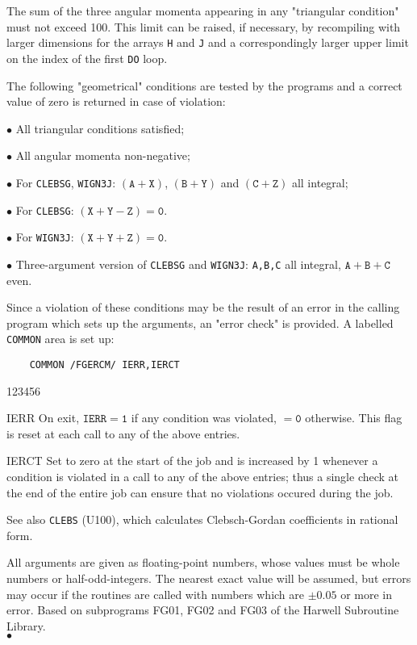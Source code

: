 \Restrict
The sum of the three angular momenta appearing in any "triangular
condition" must not exceed 100. This limit can be raised, if necessary,
by recompiling with larger dimensions for the arrays {\tt H} and {\tt J}
and a correspondingly larger upper limit on the index of the first
{\tt DO} loop.
\par
The following "geometrical" conditions are tested by the programs
and a correct value of zero is returned in case of violation:
\newpage
\begin{DLtt}{12}
\item[$\bullet$] All triangular conditions satisfied;
\item[$\bullet$] All angular momenta non-negative;
\item[$\bullet$] For {\tt CLEBSG}, {\tt WIGN3J}: $\mathtt{(A+X)}$,
$\mathtt{(B+Y)}$ and $\mathtt{(C+Z)}$ all integral;
\item[$\bullet$] For {\tt CLEBSG}: $\mathtt{(X+Y-Z) = 0.}$
\item[$\bullet$] For {\tt WIGN3J}: $\mathtt{(X+Y+Z) = 0.}$
\item[$\bullet$] Three-argument version of {\tt CLEBSG} and {\tt WIGN3J}:
{\tt A,B,C} all integral, $\mathtt{A+B+C}$ even.
\end{DLtt}
Since a violation of these conditions may be the result of an error in
the calling program which sets up the arguments, an "error
check" is provided. A labelled {\tt COMMON} area is set up:
\begin{verbatim}
    COMMON /FGERCM/ IERR,IERCT
\end{verbatim}
\begin{DLtt}{123456}
\item[IERR] On exit, $\mathtt{IERR=1}$ if any condition was violated,
$\mathtt{=0}$ otherwise. This flag is reset at each call to any of
the above entries.
\item[IERCT] Set to zero at the start of the job and is
increased by 1 whenever a condition is violated in a call to any of the
above entries; thus a single check at the end of the entire job
can ensure that no violations occured during the job.
\end{DLtt}
\Notes
See also {\tt CLEBS} (U100), which calculates Clebsch-Gordan
coefficients in rational form.
\par
All arguments are given as floating-point numbers, whose values must be
whole numbers or half-odd-integers. The nearest exact value will be
assumed, but errors may occur if the routines are called with numbers
which are $\pm 0.05$ or more in error.
\Source
Based on subprograms FG01, FG02 and FG03 of the Harwell Subroutine
Library.
\\ $\bullet$
